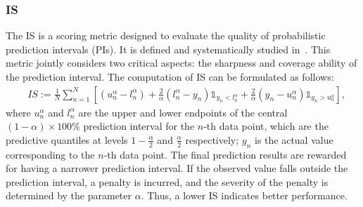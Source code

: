 \subsubsection*{\textbf{IS}}
The IS is a scoring metric designed to evaluate the quality of probabilistic prediction intervals (PIs). It is defined and systematically studied in~\cite{gneiting2007strictly}. This metric jointly considers two critical aspects: the sharpness and coverage ability of the prediction interval. The computation of IS can be formulated as follows:
\begin{equation}
\begin{aligned}
&IS:= \frac{1}{N} 
\sum_{n=1}^{N}\left[(u_n^\alpha - l_n^\alpha) + \frac{2}{\alpha}(l_n^\alpha - y_n)\mathbb{1}_{y_n < l_n^\alpha} + \frac{2}{\alpha}(y_n - u_n^\alpha)\mathbb{1}_{y_n > u_n^\alpha}\right],
\end{aligned}
\end{equation}
where $u_n^\alpha$ and $l_n^\alpha$ are the upper and lower endpoints of the central $(1 - \alpha)\times100\%$ prediction interval for the $n$-th data point, which are the predictive quantiles at levels $1-\frac{\alpha}{2}$ and $\frac{\alpha}{2}$ respectively; $y_n$ is the actual value corresponding to the $n$-th data point. The final prediction results are rewarded for having a narrower prediction interval. If the observed value falls outside the prediction interval, a penalty is incurred, and the severity of the penalty is determined by the parameter $\alpha$. Thus, a lower IS indicates better performance. 






























